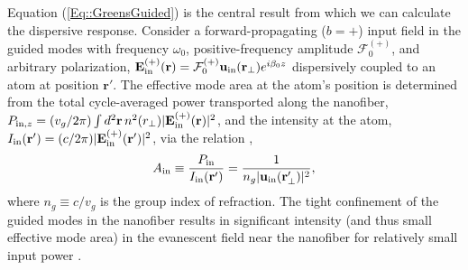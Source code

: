 \documentclass[aps,pra,twocolumn]{revtex4-1} %
\newcommand{\inp}{{\rm in}}
\newcommand{\Eamp}{\mathcal{F}_0^{(+)}}
\begin{document}
Equation (\ref{Eq::GreensGuided}) is the central result from which we can calculate the dispersive response.  Consider a forward-propagating ($b=+$) input field in the guided modes with frequency $\omega_0$, positive-frequency amplitude $\Eamp$, and arbitrary polarization, $\mathbf{E}^{(+)}_{\inp}(\br) = \Eamp  \mathbf{u}_{\rm in}(\br_\perp) e^{i \beta_0 z}$ dispersively coupled to an atom at position $\mathbf{r}'$.  The effective mode area at the atom's position is determined from the total cycle-averaged power transported along the nanofiber, $P_{{\rm in},z} = (v_g/2\pi) \int d^2\br \, n^2(r_\perp) |\mathbf{E}^{(+)}_{\inp}(\br) |^2$, and the intensity at the atom, $I_{\rm in}(\mathbf{r}') = (c/2\pi) |\mathbf{E}^{(+)}_{\inp}(\br') |^2$, via the relation \cite{domokos_quantum_2002},
 	\begin{align} \label{Eq::AreaIn}
 		A_{\rm in} \equiv \frac{P_{{\rm in}}}{I_{\rm in}(\mathbf{r}')} = \frac{1}{n_g |\mathbf{u}_{\rm in}(\mathbf{r}'_\perp)|^{2}},
	\end{align}
where $n_g\equiv c/v_g$ is the group index of refraction.  
The tight confinement of the guided modes in the nanofiber results in significant intensity (and thus small effective mode area) in the evanescent field near the nanofiber for relatively small input power \cite{bures_power_1999}.  
\end{document}
